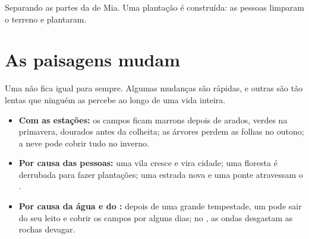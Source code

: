 \begin{omfigure}

{\small Separando as partes da  de Mia. Uma plantação é construída:
as pessoas limparam o terreno e plantaram.}
\label{fig:g1:landscapes-around-us:sort}
\end{omfigure}

\section{As paisagens mudam}

Uma  não fica igual para sempre. Algumas mudanças são rápidas, e
outras são tão lentas que ninguém as percebe ao longo de uma vida inteira.
\begin{itemize}
  \item \textbf{Com as estações:} os campos ficam marrons depois de arados,
        verdes na primavera, dourados antes da colheita; as árvores perdem
        as folhas no outono; a neve pode cobrir tudo no inverno.
  \item \textbf{Por causa das pessoas:} uma vila cresce e vira cidade; uma
        floresta é derrubada para fazer plantações; uma estrada nova e uma
        ponte atravessam o .
  \item \textbf{Por causa da água e do :} depois de uma grande
        tempestade, um  pode sair do seu leito e cobrir os campos por
        alguns dias; no , as ondas desgastam as rochas devagar.
\end{itemize}

